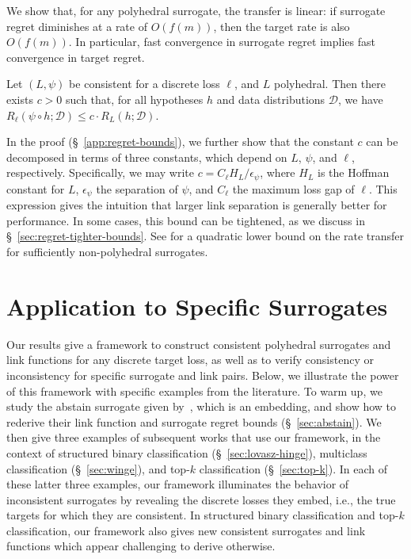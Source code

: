 \documentclass[twoside,11pt]{article}
\newcommand{\D}{\mathcal{D}}
\begin{document}
We show that, for any polyhedral surrogate, the transfer is linear: if surrogate regret diminishes at a rate of $O(f(m))$, then the target rate is also $O(f(m))$.
In particular, fast convergence in surrogate regret implies fast convergence in target regret.
\begin{theorem}
  \label{thm:linear-regret-bound}
  Let $(L,\psi)$ be consistent for a discrete loss $\ell$, and $L$ polyhedral.
  Then there exists $c > 0$ such that, for all hypotheses $h$ and data distributions $\D$, we have $R_{\ell}(\psi \circ h;\D) \leq c \cdot R_L(h;\D)$.
\end{theorem}
In the proof (\S~\ref{app:regret-bounds}), we further show that the constant $c$ can be decomposed in terms of three constants, which depend on $L$, $\psi$, and $\ell$, respectively.
Specifically, we may write $c = C_\ell H_L / \epsilon_\psi$, where $H_L$ is the Hoffman constant for $L$, $\epsilon_\psi$ the separation of $\psi$, and $C_\ell$ the maximum loss gap of $\ell$.
This expression gives the intuition that larger link separation is generally better for performance.
In some cases, this bound can be tightened, as we discuss in \S~\ref{sec:regret-tighter-bounds}.
See \citet{frongillo2021surrogate} for a quadratic lower bound on the rate transfer for sufficiently non-polyhedral surrogates.


\section{Application to Specific Surrogates}\label{sec:applications}

Our results give a framework to construct consistent polyhedral surrogates and link functions for any discrete target loss, as well as to verify consistency or inconsistency for specific surrogate and link pairs.
Below, we illustrate the power of this framework with specific examples from the literature.
To warm up, we study the abstain surrogate given by~\citet{ramaswamy2018consistent}, which is an embedding, and show how to rederive their link function and surrogate regret bounds (\S~\ref{sec:abstain}). 
We then give three examples of subsequent works that use our framework, in the context of structured binary classification (\S~\ref{sec:lovasz-hinge}), multiclass classification (\S~\ref{sec:winge}), and top-$k$ classification (\S~\ref{sec:top-k}).
In each of these latter three examples, our framework illuminates the behavior of inconsistent surrogates by revealing the discrete losses they embed, i.e., the true targets for which they are consistent.
In structured binary classification and top-$k$ classification, our framework also gives new consistent surrogates and link functions which appear challenging to derive otherwise.
\end{document}
